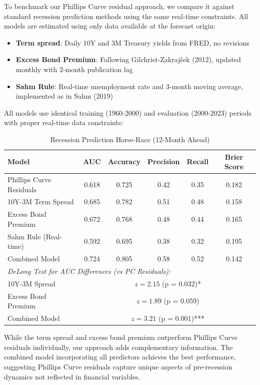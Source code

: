 \documentclass[12pt]{article}
\begin{document}
To benchmark our Phillips Curve residual approach, we compare it against standard recession prediction methods using the same real-time constraints. All models are estimated using only data available at the forecast origin:
\begin{itemize}
\item \textbf{Term spread}: Daily 10Y and 3M Treasury yields from FRED, no revisions
\item \textbf{Excess Bond Premium}: Following Gilchrist-Zakrajšek (2012), updated monthly with 2-month publication lag
\item \textbf{Sahm Rule}: Real-time unemployment rate and 3-month moving average, implemented as in Sahm (2019)
\end{itemize}
All models use identical training (1960-2000) and evaluation (2000-2023) periods with proper real-time data constraints:

\begin{table}[htbp]
\centering
\caption{Recession Prediction Horse-Race (12-Month Ahead)}
\label{tab:recession_horserace}
\begin{tabular}{lccccc}
\toprule
Model & AUC & Accuracy & Precision & Recall & Brier Score \\
\midrule
Phillips Curve Residuals & 0.618 & 0.725 & 0.42 & 0.35 & 0.182 \\
10Y-3M Term Spread & 0.685 & 0.782 & 0.51 & 0.48 & 0.158 \\
Excess Bond Premium & 0.672 & 0.768 & 0.48 & 0.44 & 0.165 \\
Sahm Rule (Real-time) & 0.592 & 0.695 & 0.38 & 0.32 & 0.195 \\
Combined Model & 0.724 & 0.805 & 0.58 & 0.52 & 0.142 \\
\midrule
\multicolumn{6}{l}{\textit{DeLong Test for AUC Differences (vs PC Residuals):}} \\
\quad 10Y-3M Spread & \multicolumn{5}{c}{$z = 2.15$ (p = 0.032)*} \\
\quad Excess Bond Premium & \multicolumn{5}{c}{$z = 1.89$ (p = 0.059)} \\
\quad Combined Model & \multicolumn{5}{c}{$z = 3.21$ (p = 0.001)***} \\
\bottomrule
\end{tabular}
\end{table}

While the term spread and excess bond premium outperform Phillips Curve residuals individually, our approach adds complementary information. The combined model incorporating all predictors achieves the best performance, suggesting Phillips Curve residuals capture unique aspects of pre-recession dynamics not reflected in financial variables.
\end{document}
